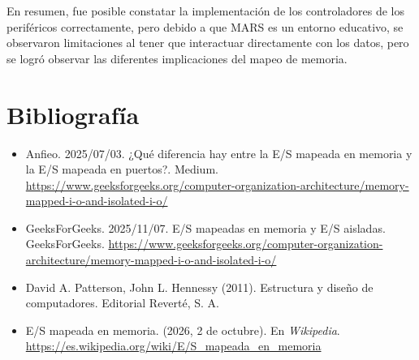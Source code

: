 \documentclass[12pt, a4paper]{article}
\begin{document}
En resumen, fue posible constatar la implementación de los controladores de los periféricos correctamente, pero debido a que MARS es un entorno educativo, se observaron limitaciones al tener que interactuar directamente con los datos, pero se logró observar las diferentes implicaciones del mapeo de memoria.
\newpage
\section{Bibliografía}
\begin{itemize}
    \item Anfieo. 2025/07/03. ¿Qué diferencia hay entre la E/S mapeada en memoria y la E/S mapeada en puertos?. Medium. \url{https://www.geeksforgeeks.org/computer-organization-architecture/memory-mapped-i-o-and-isolated-i-o/}
    \item GeeksForGeeks. 2025/11/07. E/S mapeadas en memoria y E/S aisladas. GeeksForGeeks. \url{https://www.geeksforgeeks.org/computer-organization-architecture/memory-mapped-i-o-and-isolated-i-o/}
    \item David A. Patterson, John L. Hennessy (2011). Estructura y diseño de computadores. Editorial Reverté, S. A.
    \item E/S mapeada en memoria. (2026, 2 de octubre). En \textit{Wikipedia}. \url{https://es.wikipedia.org/wiki/E/S_mapeada_en_memoria}
\end{itemize}
\end{document}
